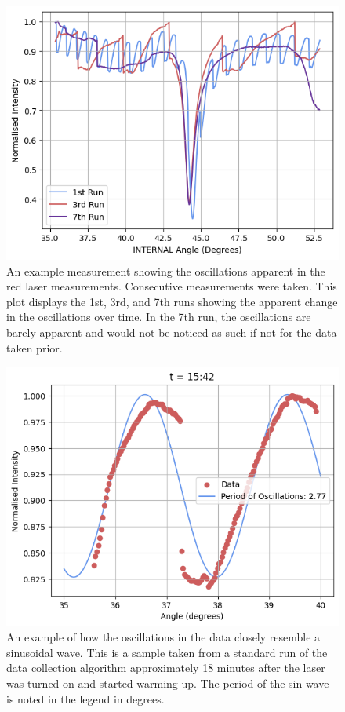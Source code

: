 \documentclass[%
reprint,
amsmath,amssymb,
aps,
]{revtex4-2}
\begin{document}
			
			\begin{figure}
				\includegraphics[width=0.85\columnwidth]{oscillationsExample.png}
				\caption{\label{fig:oscillationsExample}An example measurement showing the oscillations apparent in the red laser measurements. Consecutive measurements were taken. This plot displays the 1st, 3rd, and 7th runs showing the apparent change in the oscillations over time. In the 7th run, the oscillations are barely apparent and would not be noticed as such if not for the data taken prior.}
			\end{figure}
			\begin{figure}
				\includegraphics[width=0.85\columnwidth]{exampleTimeDependence.png}
				\caption{\label{fig:exampleSin}An example of how the oscillations in the data closely resemble a sinusoidal wave. This is a sample taken from a standard run of the data collection algorithm approximately 18 minutes after the laser was turned on and started warming up. The period of the sin wave is noted in the legend in degrees.}
			\end{figure}
\end{document}
